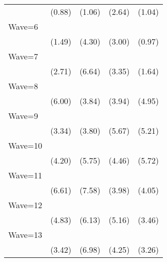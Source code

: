{\begin{tabular}{l*{4}{c}}
                    &      (0.88)         &      (1.06)         &      (2.64)         &      (1.04)         \\
[1em]
Wave=6              &                     &            \sym{***}&            \sym{**} &                     \\
                    &      (1.49)         &      (4.30)         &      (3.00)         &      (0.97)         \\
[1em]
Wave=7              &            \sym{**} &            \sym{***}&            \sym{***}&                     \\
                    &      (2.71)         &      (6.64)         &      (3.35)         &      (1.64)         \\
[1em]
Wave=8              &            \sym{***}&            \sym{***}&            \sym{***}&            \sym{***}\\
                    &      (6.00)         &      (3.84)         &      (3.94)         &      (4.95)         \\
[1em]
Wave=9              &            \sym{***}&            \sym{***}&            \sym{***}&            \sym{***}\\
                    &      (3.34)         &      (3.80)         &      (5.67)         &      (5.21)         \\
[1em]
Wave=10             &            \sym{***}&            \sym{***}&            \sym{***}&            \sym{***}\\
                    &      (4.20)         &      (5.75)         &      (4.46)         &      (5.72)         \\
[1em]
Wave=11             &            \sym{***}&            \sym{***}&            \sym{***}&            \sym{***}\\
                    &      (6.61)         &      (7.58)         &      (3.98)         &      (4.05)         \\
[1em]
Wave=12             &            \sym{***}&            \sym{***}&            \sym{***}&            \sym{***}\\
                    &      (4.83)         &      (6.13)         &      (5.16)         &      (3.46)         \\
[1em]
Wave=13             &            \sym{***}&            \sym{***}&            \sym{***}&            \sym{**} \\
                    &      (3.42)         &      (6.98)         &      (4.25)         &      (3.26)         \\

\end{tabular}}

